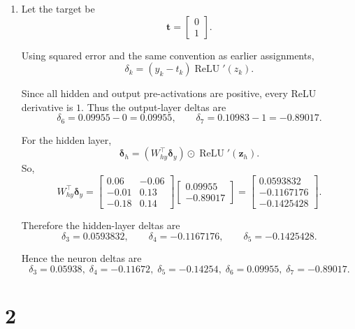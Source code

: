 \documentclass[11pt]{article}
\begin{document}
\begin{enumerate}[label=\alph*)]
Again using ReLU at the output,
\[
\bm{y}_t=\operatorname{ReLU}(\bm{z}_y)=
\begin{bmatrix}
0.09955\\
0.10983
\end{bmatrix}.
\]

Therefore the answer is:
\[
\boxed{
\bm{y}_t=
\begin{bmatrix}
0.09955\\
0.10983
\end{bmatrix}}
\]

\item Let the target be
\[
\bm{t}=
\begin{bmatrix}
0\\
1
\end{bmatrix}.
\]

Using squared error and the same convention as earlier assignments,
\[
\delta_k=(y_k-t_k)\operatorname{ReLU}'(z_k).
\]

Since all hidden and output pre-activations are positive, every ReLU derivative is \(1\).
Thus the output-layer deltas are
\[
\delta_6 = 0.09955-0 = 0.09955,
\qquad
\delta_7 = 0.10983-1 = -0.89017.
\]

For the hidden layer,
\[
\bm{\delta}_h = (W_{hy}^{\top}\bm{\delta}_y)\odot \operatorname{ReLU}'(\bm{z}_h).
\]
So,
\[
W_{hy}^{\top}\bm{\delta}_y=
\begin{bmatrix}
0.06 & -0.06\\
-0.01 & 0.13\\
-0.18 & 0.14
\end{bmatrix}
\begin{bmatrix}
0.09955\\
-0.89017
\end{bmatrix}
=
\begin{bmatrix}
0.0593832\\
-0.1167176\\
-0.1425428
\end{bmatrix}.
\]

Therefore the hidden-layer deltas are
\[
\delta_3=0.0593832,\qquad
\delta_4=-0.1167176,\qquad
\delta_5=-0.1425428.
\]

Hence the neuron deltas are
\[
\boxed{
\delta_3=0.05938,\;
\delta_4=-0.11672,\;
\delta_5=-0.14254,\;
\delta_6=0.09955,\;
\delta_7=-0.89017.}
\]
\end{enumerate}

\section*{2}
\end{document}
